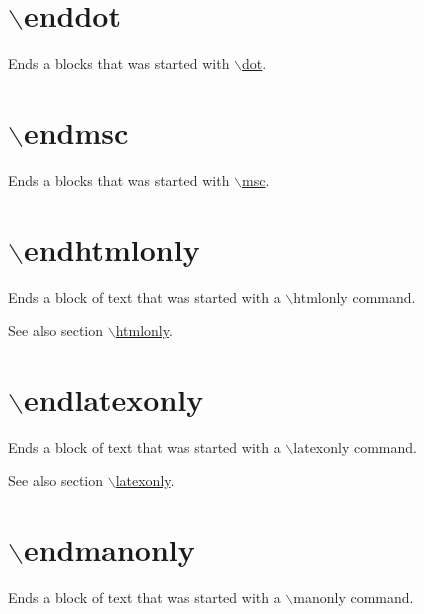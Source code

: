  \hypertarget{commands_cmdenddot}{}\section{$\backslash$enddot}\label{commands_cmdenddot}
 Ends a blocks that was started with \hyperlink{commands_cmddot}{$\backslash$dot}.



 \hypertarget{commands_cmdendmsc}{}\section{$\backslash$endmsc}\label{commands_cmdendmsc}
 Ends a blocks that was started with \hyperlink{commands_cmdmsc}{$\backslash$msc}.



 \hypertarget{commands_cmdendhtmlonly}{}\section{$\backslash$endhtmlonly}\label{commands_cmdendhtmlonly}
 Ends a block of text that was started with a $\backslash$htmlonly command.

\begin{DoxySeeAlso}{See also}
section \hyperlink{commands_cmdhtmlonly}{$\backslash$htmlonly}.
\end{DoxySeeAlso}


 \hypertarget{commands_cmdendlatexonly}{}\section{$\backslash$endlatexonly}\label{commands_cmdendlatexonly}
 Ends a block of text that was started with a $\backslash$latexonly command.

\begin{DoxySeeAlso}{See also}
section \hyperlink{commands_cmdlatexonly}{$\backslash$latexonly}.
\end{DoxySeeAlso}


 \hypertarget{commands_cmdendmanonly}{}\section{$\backslash$endmanonly}\label{commands_cmdendmanonly}
 Ends a block of text that was started with a $\backslash$manonly command.

